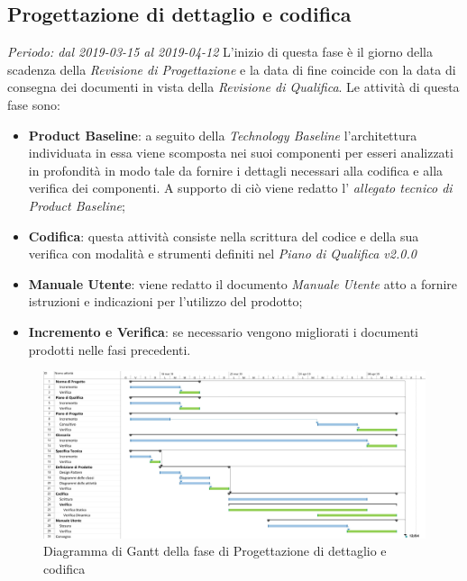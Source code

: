 \subsection{Progettazione di dettaglio e codifica}
\textit{Periodo: dal 2019-03-15 al 2019-04-12}
L'inizio di questa fase è il giorno della scadenza della \textit{Revisione di 
Progettazione} e la data di fine coincide con la data di consegna dei documenti 
in vista della \textit{Revisione di Qualifica}. Le attività di questa fase sono:
\begin{itemize}
	\item \textbf{Product Baseline}: a seguito della \textit{Technology 
	Baseline} l'architettura individuata in essa viene scomposta nei suoi 
	componenti per esseri analizzati in profondità in modo tale da fornire i 
	dettagli necessari alla codifica e alla verifica dei componenti. A supporto 
	di ciò viene redatto l' \textit{allegato tecnico di Product Baseline};
	\item \textbf{Codifica}: questa attività consiste nella scrittura del 
	codice e della sua verifica con modalità e strumenti definiti nel 
	\textit{Piano di Qualifica v2.0.0}
	\item \textbf{Manuale Utente}: viene redatto il documento \textit{Manuale 
	Utente} atto a fornire istruzioni e indicazioni per l'utilizzo del prodotto;
	\item \textbf{Incremento e Verifica}: se necessario vengono migliorati i 
	documenti prodotti nelle fasi precedenti.
\end{itemize}

\begin{figure}[H]
	\includegraphics[width=0.99\linewidth]{res/images/gantt_pd.jpg}
	\caption{Diagramma di Gantt della fase di Progettazione di dettaglio e codifica}
\end{figure}
\pagebreak



